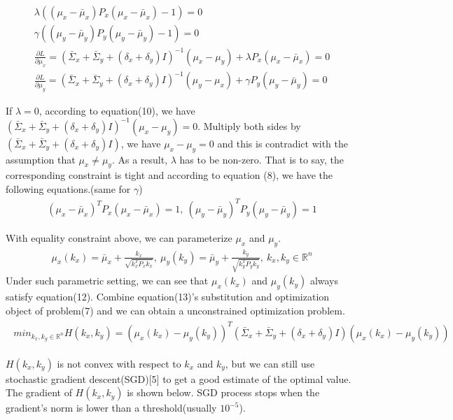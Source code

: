\documentclass{article} %
\begin{document}
\begin{align}
\lambda ((\mu_x - \bar{\mu}_x) P_x (\mu_x - \bar{\mu}_x) - 1) = 0 \\
\gamma ((\mu_y - \bar{\mu}_y) P_y (\mu_y - \bar{\mu}_y) - 1) = 0 \\
\frac{\partial L}{\partial \mu_x} = (\bar{\Sigma}_x + \bar{\Sigma}_y + (\delta_x + \delta_y) I )^{-1}(\mu_x - \mu_y) + \lambda P_x (\mu_x - \bar{\mu}_x) = 0 \\
\frac{\partial L}{\partial \mu_y} = (\bar{\Sigma}_x + \bar{\Sigma}_y + (\delta_x + \delta_y) I )^{-1}(\mu_y - \mu_x) + \gamma P_y (\mu_y - \bar{\mu}_y) = 0
\end{align}

If $\lambda = 0$, according to equation(10), we have $(\bar{\Sigma}_x + \bar{\Sigma}_y + (\delta_x + \delta_y)I)^{-1}(\mu_x - \mu_y) = 0$. Multiply both sides by $(\bar{\Sigma}_x + \bar{\Sigma}_y + (\delta_x + \delta_y)I)$, we have $\mu_x - \mu_y = 0$ and this is contradict with the assumption that $\mu_x \neq \mu_y$. As a result, $\lambda$ has to be non-zero. That is to say, the corresponding constraint is tight and according to equation (8), we have the following equations.(same for $\gamma$)
\begin{align}
(\mu_x - \bar{\mu}_x)^T P_x (\mu_x - \bar{\mu}_x) = 1,\ (\mu_y - \bar{\mu}_y)^T P_y (\mu_y - \bar{\mu}_y) = 1
\end{align}

With equality constraint above, we can parameterize $\mu_x$ and $\mu_y$.
\begin{align}
\mu_x(k_x) = \bar{\mu}_x + \frac{k_x}{\sqrt{k_x^T P_x k_x}},\ \mu_y(k_y) = \bar{\mu}_y + \frac{k_y}{\sqrt{k_y^T P_y k_y}},\ k_x, k_y \in \mathbb{R}^n
\end{align}
Under such parametric setting, we can see that $\mu_x(k_x)$ and $\mu_y(k_y)$ always satisfy equation(12). Combine equation(13)'s substitution and optimization object of problem(7) and we can obtain a unconstrained optimization problem.
\begin{align}
\begin{split}
min_{k_x, k_y \in \mathbb{R}^n} H(k_x, k_y) = (\mu_x(k_x) - \mu_y(k_y))^T (\bar{\Sigma}_x + \bar{\Sigma}_y + (\delta_x + \delta_y) I) (\mu_x(k_x) - \mu_y(k_y))
\end{split}
\end{align}

$H(k_x, k_y)$ is not convex with respect to $k_x$ and $k_y$, but we can still use stochastic gradient descent(SGD)[5] to get a good estimate of the optimal value. The gradient of $H(k_x, k_y)$ is shown below. SGD process stops when the gradient's norm is lower than a threshold(usually $10^{-5}$).
\end{document}
